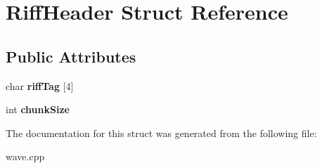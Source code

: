 \hypertarget{struct_riff_header}{
\section{RiffHeader Struct Reference}
\label{struct_riff_header}
}
\subsection*{Public Attributes}
\begin{DoxyCompactItemize}
\item 
\hypertarget{struct_riff_header_a5d225f7d82b9b4b2347ce516492b2461}{
char {\bfseries riffTag} \mbox{[}4\mbox{]}}
\label{struct_riff_header_a5d225f7d82b9b4b2347ce516492b2461}

\item 
\hypertarget{struct_riff_header_af9d09b7cc6367dd1042ccdfeffa68aee}{
int {\bfseries chunkSize}}
\label{struct_riff_header_af9d09b7cc6367dd1042ccdfeffa68aee}

\end{DoxyCompactItemize}


The documentation for this struct was generated from the following file:\begin{DoxyCompactItemize}
\item 
wave.cpp\end{DoxyCompactItemize}
